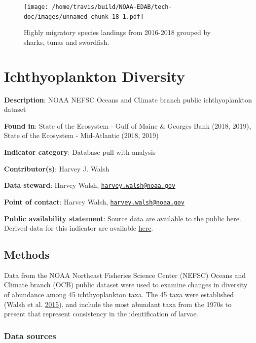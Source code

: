 \documentclass[
]{book}
\begin{document}
\begin{figure}
\centering
\texttt{[image: /home/travis/build/NOAA-EDAB/tech-doc/images/unnamed-chunk-18-1.pdf]}
\caption{\label{fig:unnamed-chunk-18}Highly migratory species landings from 2016-2018 grouped by sharks, tunas and swordfish.}
\end{figure}

\hypertarget{ichthyoplankton-diversity}{%
\chapter{Ichthyoplankton Diversity}\label{ichthyoplankton-diversity}}

\textbf{Description}: NOAA NEFSC Oceans and Climate branch public ichthyoplankton dataset

\textbf{Found in}: State of the Ecosystem - Gulf of Maine \& Georges Bank (2018, 2019), State of the Ecosystem - Mid-Atlantic (2018, 2019)

\textbf{Indicator category}: Database pull with analysis

\textbf{Contributor(s)}: Harvey J. Walsh

\textbf{Data steward}: Harvey Walsh, \href{mailto:harvey.walsh@noaa.gov}{\nolinkurl{harvey.walsh@noaa.gov}}

\textbf{Point of contact}: Harvey Walsh, \href{mailto:harvey.walsh@noaa.gov}{\nolinkurl{harvey.walsh@noaa.gov}}

\textbf{Public availability statement}: Source data are available to the public \href{ftp://ftp.nefsc.noaa.gov/pub/hydro/zooplankton_data/}{here}. Derived data for this indicator are available \href{https://comet.nefsc.noaa.gov/erddap/tabledap/ichthyo_div_soe_v1.html}{here}.

\hypertarget{methods-18}{%
\section{Methods}\label{methods-18}}

Data from the NOAA Northeast Fisheries Science Center (NEFSC) Oceans and Climate branch (OCB) public dataset were used to examine changes in diversity of abundance among 45 ichthyoplankton taxa. The 45 taxa were established (Walsh et al. \protect\hyperlink{ref-RN126}{2015}), and include the most abundant taxa from the 1970s to present that represent consistency in the identification of larvae.

\hypertarget{data-sources-18}{%
\subsection{Data sources}\label{data-sources-18}}
\end{document}
